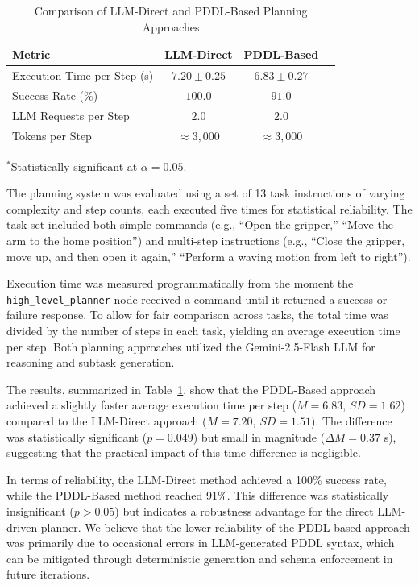 \documentclass[12pt]{extarticle}
\begin{document}
\begin{table}[h!]
\centering
\caption{Comparison of LLM-Direct and PDDL-Based Planning Approaches}
\label{tab:planning-eval}
\begin{tabular}{lccc}
\hline
\textbf{Metric} & \textbf{LLM-Direct} & \textbf{PDDL-Based} \\
\hline
Execution Time per Step (s) & $7.20 \pm 0.25$ & $6.83 \pm 0.27$ \\
Success Rate (\%) & $100.0$ & $91.0$ \\
LLM Requests per Step & $2.0$ & $2.0$ \\
Tokens per Step & $\approx 3{,}000$ & $\approx 3{,}000$ \\
\hline
\end{tabular}
\begin{flushleft}
\footnotesize{$^{*}$Statistically significant at $\alpha = 0.05$.}
\end{flushleft}
\end{table}

The planning system was evaluated using a set of 13 task instructions of varying complexity and step counts, each executed five times for statistical reliability. The task set included both simple commands (e.g., “Open the gripper,” “Move the arm to the home position”) and multi-step instructions (e.g., “Close the gripper, move up, and then open it again,” “Perform a waving motion from left to right”).

Execution time was measured programmatically from the moment the \texttt{high\_level\_planner} node received a command until it returned a success or failure response. To allow for fair comparison across tasks, the total time was divided by the number of steps in each task, yielding an average execution time per step. Both planning approaches utilized the Gemini-2.5-Flash LLM for reasoning and subtask generation.

The results, summarized in Table~\ref{tab:planning-eval}, show that the PDDL-Based approach achieved a slightly faster average execution time per step ($M = 6.83$, $SD = 1.62$) compared to the LLM-Direct approach ($M = 7.20$, $SD = 1.51$). The difference was statistically significant ($p = 0.049$) but small in magnitude ($\Delta M = 0.37$ s), suggesting that the practical impact of this time difference is negligible.

In terms of reliability, the LLM-Direct method achieved a 100\% success rate, while the PDDL-Based method reached 91\%. This difference was statistically insignificant ($p > 0.05$) but indicates a robustness advantage for the direct LLM-driven planner. We believe that the lower reliability of the PDDL-based approach was primarily due to occasional errors in LLM-generated PDDL syntax, which can be mitigated through deterministic generation and schema enforcement in future iterations.
\end{document}
